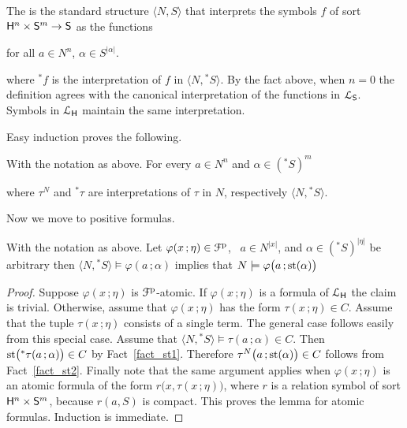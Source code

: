 \documentclass{amsproc}
\renewcommand*{\emph}[1]{%
   \smash{\tikz[baseline]\node[rectangle, fill=teal!25, rounded corners, inner xsep=0.5ex, inner ysep=0.2ex, anchor=base, minimum height = 2.7ex]{\strut #1};}}
\begin{document}
The \emph{standard part of $\langle N,{}^*\!\!S\rangle$\/} is the standard structure $\langle N,S\rangle$ that interprets the symbols $f$ of sort ${\sf H}^n\times{\sf S}^m\to {\sf S}$ as the functions

\hfill for all $a\in N^n$, $\alpha\in S^{|\alpha|}$.

where ${}^*\!\!f$ is the interpretation of $f$ in $\langle N,{}^*\!\!S\rangle$.
By the fact above, when $n=0$ the definition agrees with the canonical interpretation of the functions in ${\EuScript L}_{\sf S}$.
Symbols in ${\EuScript L}_{\sf H}$ maintain the same interpretation.

Easy induction proves the following.

\begin{fact}\label{fact_st2} 
  With the notation as above.
  For every $a\in N^n$ and $\alpha\in ({}^*\!\!S)^m$


  where $\tau^N$ and ${}^*\!\tau$ are interpretations of $\tau$ in $N$, respectively $\langle N,{}^*\!\!S\rangle$.
\end{fact}

Now we move to positive formulas.


\begin{lemma}\label{lem_st}
  With the notation as above.
  Let $\varphi(x\,;\eta)\in{\EuScript F}^{\rm p}$, \  $a\in N^{|x|}$, and $\alpha\in({}^*\!\!S)^{|\eta|}$ be arbitrary then $\langle N,{}^*\!\!S\rangle\models\varphi(a\,;\alpha)$ implies that $N\models\varphi\big(a\,;{\rm st}(\alpha)\big)$
\end{lemma}

\begin{proof}
  Suppose $\varphi(x\,;\eta)$ is ${\EuScript F}^{\rm p}$-atomic.
  If $\varphi(x\,;\eta)$ is a formula of ${\EuScript L}_{\sf H}$ the claim is trivial. 
  Otherwise, assume that $\varphi(x\,;\eta)$ has the form $\tau(x\,;\eta)\in C$.
  Assume that the tuple $\tau(x\,;\eta)$ consists of a single term.
  The general case follows easily from this special case. 
  Assume that $\langle N,{}^*\!\!S\rangle\models \tau(a\,;\alpha)\in C$.
  Then ${\rm st}\big({}^*\tau(a\,;\alpha)\big)\in C$ by Fact~\ref{fact_st1}.
  Therefore $\tau^N\big(a\,;{\rm st}(\alpha)\big)\in C$ follows from Fact~\ref{fact_st2}.
  Finally note that the same argument applies when $\varphi(x\,;\eta)$ is an atomic formula of the form $r\big(x,\tau(x\,;\eta)\big)$, where $r$ is a relation symbol of sort ${\sf H}^n\times{\sf S}^m$, because $r(a,S)$ is compact.
  This proves the lemma for atomic formulas.
  Induction is immediate. 
\end{proof}
\end{document}
